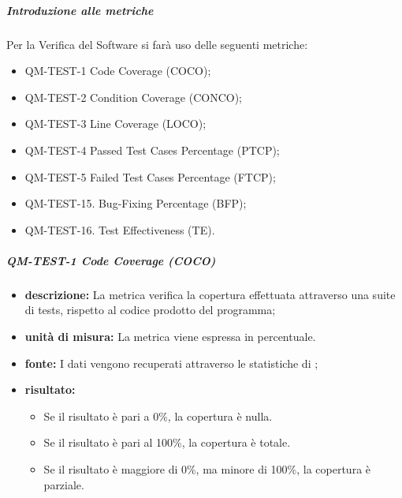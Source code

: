         \subparagraph{Introduzione alle metriche}

             Per la Verifica del Software si farà uso delle seguenti metriche:

            \begin{itemize}

                \item QM-TEST-1 Code Coverage (COCO);
                \item QM-TEST-2 Condition Coverage (CONCO);
                \item QM-TEST-3 Line Coverage (LOCO);
                \item QM-TEST-4 Passed Test Cases Percentage (PTCP);
                \item QM-TEST-5 Failed Test Cases Percentage (FTCP);
                \item QM-TEST-15. Bug-Fixing Percentage (BFP);
                \item QM-TEST-16. Test Effectiveness (TE).
            \end{itemize}

                
            \subparagraph{QM-TEST-1 Code Coverage (COCO)}
            \begin{itemize}
                \item \textbf{descrizione: }
                    La metrica verifica la copertura effettuata attraverso una suite di tests, rispetto al codice prodotto del programma;

                \item \textbf{unità di misura: }
                La metrica viene espressa in percentuale.

                \item \textbf{fonte: }
                    I dati vengono recuperati attraverso le statistiche di ;

                \item \textbf{risultato: }
                \begin{itemize}
                    \item Se il risultato è pari a 0\%, la copertura è nulla.
                    \item Se il risultato è pari al 100\%, la copertura è totale.
                    \item Se il risultato è maggiore di 0\%, ma minore di 100\%, la copertura è parziale.
                \end{itemize}
            \end{itemize}



